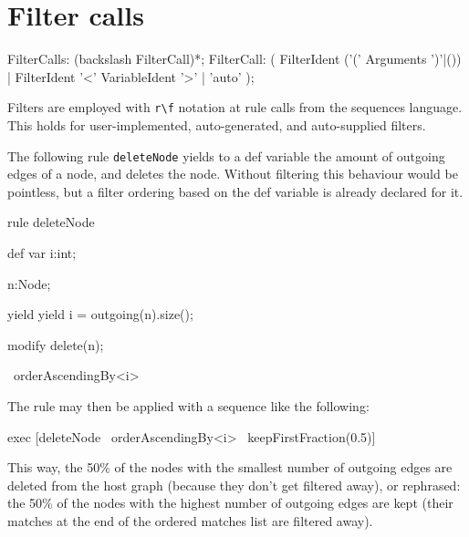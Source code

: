 \section{Filter calls}

\begin{rail}
	FilterCalls: (backslash FilterCall)*;
  FilterCall: ( FilterIdent ('(' Arguments ')'|()) | FilterIdent '<' VariableIdent '>' | 'auto' );
\end{rail}

Filters are employed with \verb#r\f# notation at rule calls from the sequences language.
This holds for user-implemented, auto-generated, and auto-supplied filters.

\begin{example}
The following rule \texttt{deleteNode} yields to a def variable the amount of outgoing edges of a node, and deletes the node.
Without filtering this behaviour would be pointless, but a filter ordering based on the def variable is already declared for it.
\begin{grgen}
rule deleteNode
{
	def var i:int;

	n:Node;

	yield {
		yield i = outgoing(n).size();
	}
	
	modify{
		delete(n);
	}
} \ orderAscendingBy<i>
\end{grgen}
The rule may then be applied with a sequence like the following:
\begin{grshell}
  exec [deleteNode \ orderAscendingBy<i> \ keepFirstFraction(0.5)]
\end{grshell}
This way, the 50\% of the nodes with the smallest number of outgoing edges are deleted from the host graph (because they don't get filtered away), or rephrased: the 50\% of the nodes with the highest number of outgoing edges are kept (their matches at the end of the ordered matches list are filtered away).
\end{example}
	
